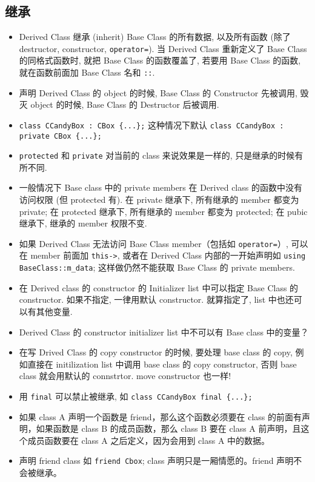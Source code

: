\subsection{继承}
\begin{itemize}

\item Derived Class 继承 (inherit) Base Class 的所有数据, 以及所有函数 (除了 destructor, constructor, \verb|operator=|). 当 Derived Class 重新定义了 Base Class 的同格式函数时, 就把 Base Class 的函数覆盖了, 若要用 Base Class 的函数, 就在函数前面加 Base Class 名和 \verb|::|.
\item 声明 Derived Class 的 object 的时候, Base Class 的 Constructor 先被调用, 毁灭 object 的时候, Base Class 的 Destructor 后被调用.
\item \verb|class CCandyBox : CBox {...};| 这种情况下默认 \verb|class CCandyBox : private CBox {...};|
\item \verb|protected| 和 \verb|private| 对当前的 class 来说效果是一样的, 只是继承的时候有所不同.
\item 一般情况下 Base class 中的 private members 在 Derived class 的函数中没有访问权限 (但 protected 有). 在 private 继承下, 所有继承的 member 都变为 private; 在 protected 继承下, 所有继承的 member 都变为 protected; 在 pubic 继承下, 继承的 member 权限不变.
\item 如果 Derived Class 无法访问 Base Class member（包括如 \verb|operator=|）, 可以在 member 前面加 \verb|this->|, 或者在 Derived Class 内部的一开始声明如 \verb|using BaseClass::m_data|; 这样做仍然不能获取 Base Class 的 private members.
\item 在 Derived class 的 constructor 的 Initializer list 中可以指定 Base Class 的 constructor. 如果不指定, 一律用默认 constructor. 就算指定了, list 中也还可以有其他变量.
\item Derived Class 的 constructor initializer list 中不可以有 Base class 中的变量？
\item 在写 Drived Class 的 copy constructor 的时候, 要处理 base class 的 copy, 例如直接在 initilization list 中调用 base class 的 copy constructor, 否则 base class 就会用默认的 connstrtor. move constructor 也一样!
\item 用 \verb|final| 可以禁止被继承, 如 \verb|class CCandyBox final {...};|
\item 如果 class A 声明一个函数是 friend，那么这个函数必须要在 class 的前面有声明，如果函数是 class B 的成员函数，那么 class B 要在 class A 前声明，且这个成员函数要在 class A 之后定义，因为会用到 class A 中的数据。
\item 声明 friend class 如 \verb|friend Cbox|; class 声明只是一厢情愿的。friend 声明不会被继承。
\end{itemize}

